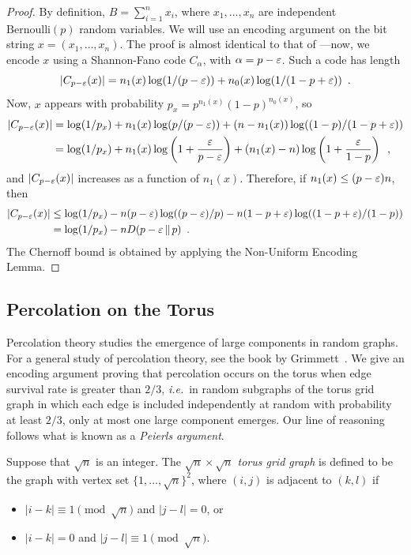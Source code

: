 \documentclass[prodmode,acmcsur]{acmsmall}
\begin{document}
\begin{proof}
  By definition, $B=\sum_{i=1}^n x_i$, where $x_1,\ldots,x_n$ are
  independent $\mathrm{Bernoulli}(p)$ random variables.  We will use
  an encoding argument on the bit string $x=(x_1,\ldots,x_n)$. The
  proof is almost identical to that of ---now,
  we encode $x$ using a Shannon-Fano code $C_\alpha$, with
  $\alpha = p - \varepsilon$. Such a code has length
  \[
    |C_{p - \varepsilon}(x)| = n_1(x) \log (1/(p - \varepsilon)) + n_0(x) \log (1/(1
    - p + \varepsilon)) \enspace .
  \]
  Now, $x$ appears with probability
  $p_x = p^{n_1(x)} (1 - p)^{n_0(x)}$, so
  \begin{align*}
    |C_{p - \varepsilon}(x)| &= \log(1/p_x) + 
         n_1(x) \log (p/(p - \varepsilon)) + (n - n_1(x)) \log ((1 - p)/(1 - p + \varepsilon)) \\
         &= \log (1/p_x) + n_1(x) \log \left(1 + \frac{\varepsilon}{p - \varepsilon}\right) + 
(n_1(x) - n) \log \left(1 + \frac{\varepsilon}{1 - p}\right) \enspace ,
  \end{align*}
  and $|C_{p - \varepsilon}(x)|$ increases as a function of
  $n_1(x)$. Therefore, if $n_1(x) \le (p - \varepsilon)n$, then
  \begin{align*}
    |C_{p - \varepsilon}(x)| &\le \log (1/p_x) - n (p - \varepsilon) \log ((p - \varepsilon)/p) - n (1 - p + \varepsilon) \log ((1 - p + \varepsilon)/(1 - p)) \\
                      &= \log (1/p_x) - n D(p - \varepsilon \,\|\, p) \enspace .
  \end{align*}
  The Chernoff bound is obtained by applying the Non-Uniform Encoding
  Lemma.
\end{proof}

\subsection{Percolation on the Torus}

Percolation theory studies the emergence of large components in random
graphs. For a general study of percolation theory, see the book by
Grimmett~\cite{grimmett:percolation}.  We give an encoding argument
proving that percolation occurs on the torus when edge survival rate
is greater than $2/3$, \emph{i.e.}~in random subgraphs of the torus
grid graph in which each edge is included independently at random with
probability at least $2/3$, only at most one large component
emerges. Our line of reasoning follows what is known as a
\emph{Peierls argument}.

Suppose that $\sqrt{n}$ is an integer. The \emph{$\sqrt{n} \times \sqrt{n}$
  torus grid graph} is defined to be the graph with vertex set
$\{1, \ldots, \sqrt{n}\}^2$, where $(i, j)$ is adjacent to $(k, l)$
if
\begin{itemize}[topsep=0pt]
\item $|i - k| \equiv 1 \pmod{\sqrt{n}}$ and $|j - l| = 0$, or
\item $|i - k| = 0$ and $|j - l| \equiv 1 \pmod{\sqrt{n}}$.
\end{itemize}
\end{document}
